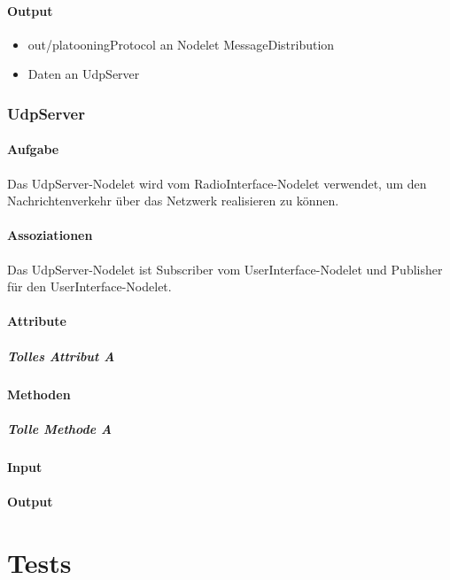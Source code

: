 \documentclass[a4paper, 12pt, titlepage]{scrartcl}
\begin{document}
				\paragraph{Output}
				    \begin{itemize}
				        \item out/platooningProtocol an Nodelet MessageDistribution
				        \item Daten an UdpServer
				    \end{itemize}

		    \subsubsection{UdpServer}
			\label{udpserver}
				\paragraph{Aufgabe} Das UdpServer-Nodelet wird vom RadioInterface-Nodelet verwendet, um den Nachrichtenverkehr über das Netzwerk realisieren zu können.
				\paragraph{Assoziationen} Das UdpServer-Nodelet ist Subscriber vom UserInterface-Nodelet und Publisher für den UserInterface-Nodelet.
				\paragraph{Attribute}
					\subparagraph{Tolles Attribut A}
				\paragraph{Methoden}
					\subparagraph{Tolle Methode A}
				\paragraph{Input}
				\paragraph{Output}

	\section{Tests}
	\label{tests}
\end{document}
